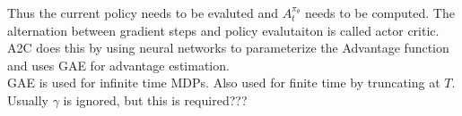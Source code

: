 \documentclass[../main.tex]{subfiles}  %
\begin{document}
Thus the current policy needs to be evaluted and $A_t^{\pi_{\theta}}$ needs to be computed. The alternation between gradient steps and policy evalutaiton is called actor critic. A2C does this by using neural networks to parameterize the Advantage function and uses GAE for advantage estimation.\\
GAE is used for infinite time MDPs. Also used for finite time by truncating at $T$.
Usually $\gamma$ is ignored, but this is required???\\
\end{document}
